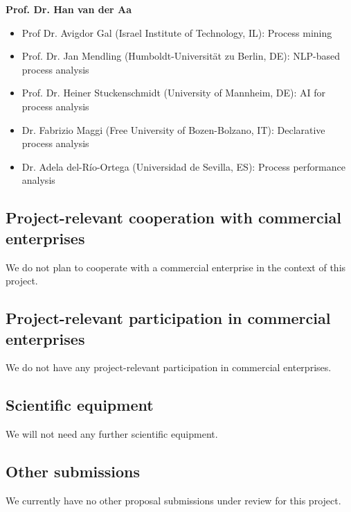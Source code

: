\textbf{Prof. Dr. Han van der Aa}

\begin{itemize}
\item Prof Dr. Avigdor Gal (Israel Institute of Technology, IL): Process mining
\item Prof. Dr. Jan Mendling (Humboldt-Universit\"at zu Berlin, DE): NLP-based process analysis 
\item Prof. Dr. Heiner Stuckenschmidt (University of Mannheim, DE): AI for process analysis
\item Dr. Fabrizio Maggi (Free University of Bozen-Bolzano, IT): Declarative process analysis
\item Dr. Adela del-R\'{i}o-Ortega (Universidad de Sevilla, ES): Process performance analysis
\end{itemize}


\subsection{Project-relevant cooperation with commercial enterprises}

We do not plan to cooperate with a commercial enterprise in the context of this project. 


\subsection{Project-relevant participation in commercial enterprises}

We do not have any project-relevant participation in commercial enterprises.  

\subsection{Scientific equipment}

We will not need any further scientific equipment. 

\subsection{Other submissions}

We currently have no other proposal submissions under review for this project.  